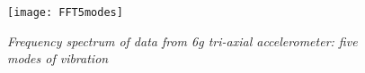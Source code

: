\begin{figure}
\centering
\texttt{[image: FFT5modes]}
\caption{\textit{Frequency spectrum of data from 6g tri-axial accelerometer: five modes of vibration}}
\label{fig:RES_6g_FFT}
\end{figure}

